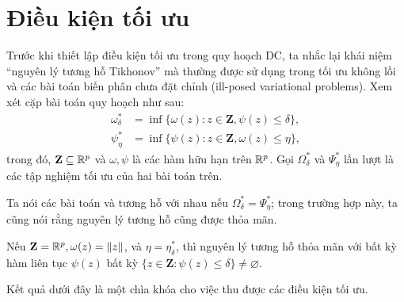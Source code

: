 \documentclass[a4paper]{report}
\begin{document}
    \section{Điều kiện tối ưu}
    \label{sec:optim_cond}
    Trước khi thiết lập điều kiện tối ưu trong quy hoạch DC, ta nhắc lại khái niệm ``nguyên lý tương hỗ Tikhonov'' mà thường được sử dụng trong tối ưu không lồi và các bài toán biến phân chưa đặt chỉnh (ill-posed variational problems). Xem xét cặp bài toán quy hoạch như sau:
    \begin{align}
        \label{eq:programming_prob_01}
        \omega^*_{\delta} &= \inf\{\omega(z): z \in \mathbf{Z}, \psi(z) \leq \delta\},\\
        \label{eq:programming_prob_02}
        \psi^*_{\eta} &= \inf\{\psi(z): z \in \mathbf{Z}, \omega(z) \leq \eta\},
    \end{align}
    trong đó, $\mathbf{Z} \subseteq \mathbb{R}^p$ và $\omega, \psi$ là các hàm hữu hạn trên $\mathbb{R}^p$. Gọi $\Omega_{\delta}^*$ và $\Psi_{\eta}^*$ lần lượt là các tập nghiệm tối ưu của hai bài toán trên.

    \begin{definition}
        \label{def:two_problems_reciprocal}
        Ta nói các bài toán  và  tương hỗ với nhau nếu $\Omega_{\delta}^* = \Psi_{\eta}^*$; trong trường hợp này, ta cũng nói rằng nguyên lý tương hỗ cũng được thỏa mãn.
    \end{definition}

    \begin{proposition}
        \label{prop:reciprocity_principle_two_problems}
        Nếu $\mathbf{Z} = \mathbb{R}^p, \omega(z) = \| z\|$, và $\eta = \eta_{\delta}^*$, thì nguyên lý tương hỗ thỏa mãn với bất kỳ hàm liên tục $\psi(z)$ bất kỳ $\{z \in \mathbf{Z}: \psi(z) \leq \delta\} \ne \varnothing$.
    \end{proposition}

    Kết quả dưới đây là một chìa khóa cho việc thu được các điều kiện tối ưu.
\end{document}
